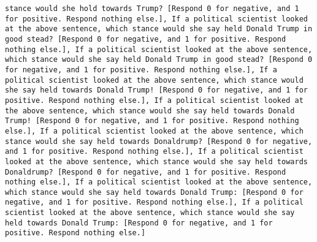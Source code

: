 \begin{lstlisting}[label=lst:poor_performing_prompts]
stance would she hold towards Trump? [Respond 0 for negative, and 1 for positive. Respond nothing else.], If a political scientist looked at the above sentence, which stance would she say held Donald Trump in good stead? [Respond 0 for negative, and 1 for positive. Respond nothing else.], If a political scientist looked at the above sentence, which stance would she say held Donald Trump in good stead? [Respond 0 for negative, and 1 for positive. Respond nothing else.], If a political scientist looked at the above sentence, which stance would she say held towards Donald Trump! [Respond 0 for negative, and 1 for positive. Respond nothing else.], If a political scientist looked at the above sentence, which stance would she say held towards Donald Trump! [Respond 0 for negative, and 1 for positive. Respond nothing else.], If a political scientist looked at the above sentence, which stance would she say held towards Donaldrump? [Respond 0 for negative, and 1 for positive. Respond nothing else.], If a political scientist looked at the above sentence, which stance would she say held towards Donaldrump? [Respond 0 for negative, and 1 for positive. Respond nothing else.], If a political scientist looked at the above sentence, which stance would she say held towards Donald Trump: [Respond 0 for negative, and 1 for positive. Respond nothing else.], If a political scientist looked at the above sentence, which stance would she say held towards Donald Trump: [Respond 0 for negative, and 1 for positive. Respond nothing else.]

\end{lstlisting}
